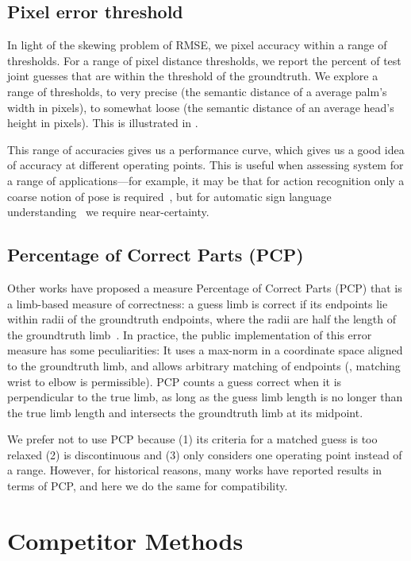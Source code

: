\subsection{Pixel error threshold}  In light of the skewing problem of RMSE, we 
pixel accuracy within a range of thresholds.  For a range of pixel distance 
thresholds, we report the percent of test joint guesses that are within the 
threshold of the groundtruth.  We explore a range of thresholds, to very 
precise (the semantic distance of a average palm's width in pixels), to 
somewhat loose (the semantic distance of an average head's height in pixels).  
This is illustrated in .

This range of accuracies gives us a performance curve, which gives us a good 
idea of accuracy at different operating points.  This is useful when assessing 
system for a range of applications---for example, it may be that for action 
recognition only a coarse notion of pose is required~\citep{wang2011}, but for 
automatic sign language understanding~\citep{buehler2009} we require 
near-certainty.

\subsection{Percentage of Correct Parts (PCP)}  Other works have proposed a 
measure Percentage of Correct Parts (PCP) that is a limb-based measure of 
correctness: a guess limb is correct if its endpoints lie within radii of the 
groundtruth endpoints, where the radii are half the length of the groundtruth 
limb~\citep{ferrari08,eichner09}.  In practice, the public implementation of 
this error measure has some peculiarities: It uses a max-norm in a coordinate 
space aligned to the groundtruth limb, and allows arbitrary matching of 
endpoints (\eg, matching wrist to elbow is permissible).  PCP counts a guess 
correct when it is perpendicular to the true limb, as long as the guess limb 
length is no longer than the true limb length and intersects the groundtruth 
limb at its midpoint.  

We prefer not to use PCP because (1) its criteria for a matched guess is too 
relaxed (2) is discontinuous and (3) only considers one operating point instead 
of a range.  However, for historical reasons, many works have reported results 
in terms of PCP, and here we do the same for compatibility.

\section{Competitor Methods}\label{sec:competition}


